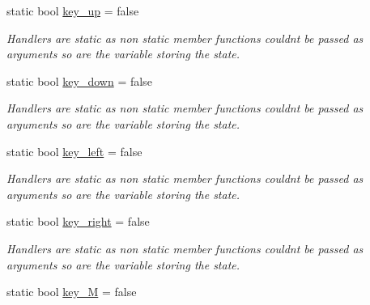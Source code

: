 \begin{DoxyCompactItemize}
\item 
static bool \hyperlink{classcft_1_1Crafter_ab9c026d68e1732d7dc21259dcad3cd1c}{key\+\_\+up} = false\hypertarget{classcft_1_1Crafter_ab9c026d68e1732d7dc21259dcad3cd1c}{}\label{classcft_1_1Crafter_ab9c026d68e1732d7dc21259dcad3cd1c}

\begin{DoxyCompactList}\small\item\em Handlers are static as non static member functions couldn\textquotesingle{}t be passed as arguments so are the variable storing the state. \end{DoxyCompactList}\item 
static bool \hyperlink{classcft_1_1Crafter_a19722ca805f96abccf36377a6806be11}{key\+\_\+down} = false\hypertarget{classcft_1_1Crafter_a19722ca805f96abccf36377a6806be11}{}\label{classcft_1_1Crafter_a19722ca805f96abccf36377a6806be11}

\begin{DoxyCompactList}\small\item\em Handlers are static as non static member functions couldn\textquotesingle{}t be passed as arguments so are the variable storing the state. \end{DoxyCompactList}\item 
static bool \hyperlink{classcft_1_1Crafter_a0ed59897a463c72fbd32dc18a92996f3}{key\+\_\+left} = false\hypertarget{classcft_1_1Crafter_a0ed59897a463c72fbd32dc18a92996f3}{}\label{classcft_1_1Crafter_a0ed59897a463c72fbd32dc18a92996f3}

\begin{DoxyCompactList}\small\item\em Handlers are static as non static member functions couldn\textquotesingle{}t be passed as arguments so are the variable storing the state. \end{DoxyCompactList}\item 
static bool \hyperlink{classcft_1_1Crafter_a82b154c79774e330a091f8b900cffe6e}{key\+\_\+right} = false\hypertarget{classcft_1_1Crafter_a82b154c79774e330a091f8b900cffe6e}{}\label{classcft_1_1Crafter_a82b154c79774e330a091f8b900cffe6e}

\begin{DoxyCompactList}\small\item\em Handlers are static as non static member functions couldn\textquotesingle{}t be passed as arguments so are the variable storing the state. \end{DoxyCompactList}\item 
static bool \hyperlink{classcft_1_1Crafter_ad3cd666334f96bdae838c493f555f4bf}{key\+\_\+M} = false\hypertarget{classcft_1_1Crafter_ad3cd666334f96bdae838c493f555f4bf}{}\label{classcft_1_1Crafter_ad3cd666334f96bdae838c493f555f4bf}


\end{DoxyCompactItemize}
